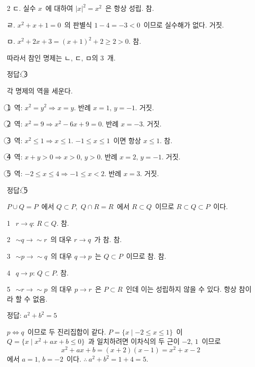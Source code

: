 \documentclass[10pt,fleqn]{article}
\begin{document}
\begin{multicols*}{2}
ㄷ. 실수 $x$\ 에 대하여 $|x|^{2}=x^{2}$\ 은 항상 성립. 참.

ㄹ. $x^{2}+x+1=0$\ 의 판별식 $1-4=-3<0$\ 이므로 실수해가 없다. 거짓.

ㅁ. $x^{2}+2x+3=(x+1)^{2}+2\ge 2>0$. 참.

\vspace{3mm}
따라서 참인 명제는 ㄴ, ㄷ, ㅁ의 $3$\ 개.

\begin{dmanswerbox}
정답: \textcircled{\scriptsize 3}
\end{dmanswerbox}

각 명제의 역을 세운다.

\vspace{3mm}
\textcircled{\scriptsize 1}\ 역: $x^{2}=y^{2}\Rightarrow x=y$. 반례 $x=1,\,y=-1$. 거짓.

\textcircled{\scriptsize 2}\ 역: $x^{2}=9\Rightarrow x^{2}-6x+9=0$. 반례 $x=-3$. 거짓.

\textcircled{\scriptsize 3}\ 역: $x^{2}\le 1\Rightarrow x\le 1$. $-1\le x\le 1$\ 이면 항상 $x\le 1$. 참.

\textcircled{\scriptsize 4}\ 역: $x+y>0\Rightarrow x>0,\,y>0$. 반례 $x=2,\,y=-1$. 거짓.

\textcircled{\scriptsize 5}\ 역: $-2\le x\le 4\Rightarrow -1\le x<2$. 반례 $x=3$. 거짓.

\begin{dmanswerbox}
정답: \textcircled{\scriptsize 5}
\end{dmanswerbox}

$P\cup Q=P$\ 에서 $Q\subset P$,\ $Q\cap R=R$\ 에서 $R\subset Q$\ 이므로 $R\subset Q\subset P$\ 이다.

\vspace{3mm}
\textcircled{\scriptsize 1}\ $r\to q$: $R\subset Q$. 참.

\textcircled{\scriptsize 2}\ $\sim q\to\sim r$\ 의 대우 $r\to q$\ 가 참. 참.

\textcircled{\scriptsize 3}\ $\sim p\to\sim q$\ 의 대우 $q\to p$\ 는 $Q\subset P$\ 이므로 참. 참.

\textcircled{\scriptsize 4}\ $q\to p$: $Q\subset P$. 참.

\textcircled{\scriptsize 5}\ $\sim r\to\sim p$\ 의 대우 $p\to r$\ 은 $P\subset R$\ 인데 이는 성립하지 않을 수 있다. 항상 참이라 할 수 없음.

\begin{dmanswerbox}
정답: $a^2+b^2=5$
\end{dmanswerbox}

$p\Leftrightarrow q$\ 이므로 두 진리집합이 같다. $P=\{x\mid -2\le x\le 1\}$\ 이 $Q=\{x\mid x^{2}+ax+b\le 0\}$\ 과 일치하려면 이차식의 두 근이 $-2,\,1$\ 이므로
\[ x^{2}+ax+b=(x+2)(x-1)=x^{2}+x-2 \]
에서 $a=1,\,b=-2$\ 이다. $\therefore\ a^{2}+b^{2}=1+4=5$.

\end{multicols*}
\end{document}
